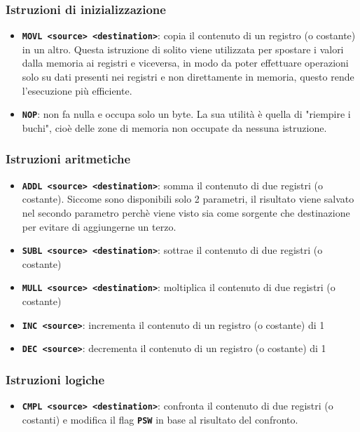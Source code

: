 \documentclass[a4paper]{article}
\theoremstyle{break}
\theoremstyle{break}
\theoremstyle{break}
\theoremstyle{break}
\begin{document}
\subsubsection{Istruzioni di inizializzazione}
\begin{itemize}
	\item \textbf{\texttt{MOVL <source> <destination>}}: copia il contenuto di un registro (o costante) in un altro.
	      Questa istruzione di solito viene utilizzata per spostare i valori dalla memoria ai
	      registri e viceversa, in modo da poter effettuare operazioni solo su dati presenti
	      nei registri e non direttamente in memoria, questo rende l'esecuzione più efficiente.
	\item \textbf{\texttt{NOP}}: non fa nulla e occupa solo un byte. La sua utilità è quella
	      di "riempire i buchi", cioè delle zone di memoria non occupate da nessuna istruzione.
\end{itemize}

\subsubsection{Istruzioni aritmetiche}
\begin{itemize}
	\item \textbf{\texttt{ADDL <source> <destination>}}: somma il contenuto di due registri (o costante).
	      Siccome sono disponibili solo 2 parametri, il risultato viene salvato nel secondo parametro
	      perchè viene visto sia come sorgente che destinazione per evitare di aggiungerne un terzo.
	\item \textbf{\texttt{SUBL <source> <destination>}}: sottrae il contenuto di due registri (o costante)
	\item \textbf{\texttt{MULL <source> <destination>}}: moltiplica il contenuto di due registri (o costante)
	\item \textbf{\texttt{INC <source>}}: incrementa il contenuto di un registro (o costante) di 1
	\item \textbf{\texttt{DEC <source>}}: decrementa il contenuto di un registro (o costante) di 1
\end{itemize}

\subsubsection{Istruzioni logiche}

\begin{itemize}
	\item \textbf{\texttt{CMPL <source> <destination>}}: confronta il contenuto di due registri (o costanti) e
	      modifica il flag \textbf{\texttt{PSW}} in base al risultato del confronto.
\end{itemize}
\end{document}
